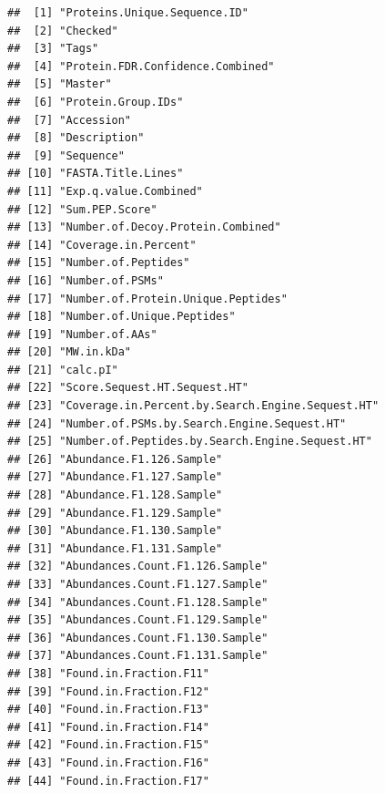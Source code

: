 \documentclass[9pt,a4paper,]{extarticle}
\begin{document}
\begin{verbatim}
##  [1] "Proteins.Unique.Sequence.ID"                    
##  [2] "Checked"                                        
##  [3] "Tags"                                           
##  [4] "Protein.FDR.Confidence.Combined"                
##  [5] "Master"                                         
##  [6] "Protein.Group.IDs"                              
##  [7] "Accession"                                      
##  [8] "Description"                                    
##  [9] "Sequence"                                       
## [10] "FASTA.Title.Lines"                              
## [11] "Exp.q.value.Combined"                           
## [12] "Sum.PEP.Score"                                  
## [13] "Number.of.Decoy.Protein.Combined"               
## [14] "Coverage.in.Percent"                            
## [15] "Number.of.Peptides"                             
## [16] "Number.of.PSMs"                                 
## [17] "Number.of.Protein.Unique.Peptides"              
## [18] "Number.of.Unique.Peptides"                      
## [19] "Number.of.AAs"                                  
## [20] "MW.in.kDa"                                      
## [21] "calc.pI"                                        
## [22] "Score.Sequest.HT.Sequest.HT"                    
## [23] "Coverage.in.Percent.by.Search.Engine.Sequest.HT"
## [24] "Number.of.PSMs.by.Search.Engine.Sequest.HT"     
## [25] "Number.of.Peptides.by.Search.Engine.Sequest.HT" 
## [26] "Abundance.F1.126.Sample"                        
## [27] "Abundance.F1.127.Sample"                        
## [28] "Abundance.F1.128.Sample"                        
## [29] "Abundance.F1.129.Sample"                        
## [30] "Abundance.F1.130.Sample"                        
## [31] "Abundance.F1.131.Sample"                        
## [32] "Abundances.Count.F1.126.Sample"                 
## [33] "Abundances.Count.F1.127.Sample"                 
## [34] "Abundances.Count.F1.128.Sample"                 
## [35] "Abundances.Count.F1.129.Sample"                 
## [36] "Abundances.Count.F1.130.Sample"                 
## [37] "Abundances.Count.F1.131.Sample"                 
## [38] "Found.in.Fraction.F11"                          
## [39] "Found.in.Fraction.F12"                          
## [40] "Found.in.Fraction.F13"                          
## [41] "Found.in.Fraction.F14"                          
## [42] "Found.in.Fraction.F15"                          
## [43] "Found.in.Fraction.F16"                          
## [44] "Found.in.Fraction.F17"                          

\end{verbatim}
\end{document}
